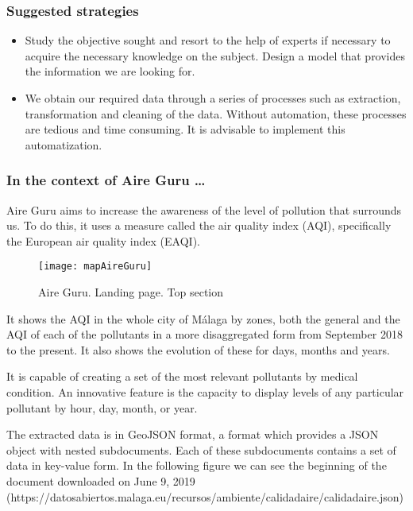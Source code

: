 \subsubsection*{Suggested strategies} 

\begin{itemize}
    \item Study the objective sought and resort to the help of experts if necessary to acquire the necessary knowledge
    on the subject. Design a model that provides the information we are looking for.

    \item We obtain our required data through a series of processes such as extraction, transformation and
    cleaning of the data. Without automation, these processes are tedious and time consuming. It is advisable to 
    implement this automatization.
\end{itemize}

\subsubsection*{In the context of Aire Guru \ldots} 

Aire Guru aims to increase the awareness of the level of pollution that surrounds us. To do this, it uses a measure called
the air quality index (AQI), specifically the European air quality index (EAQI).

\begin{figure}[ht]
    \centering
    \texttt{[image: mapAireGuru]}
    \caption{Aire Guru. Landing page. Top section}
\end{figure}

It shows the AQI in the whole city of Málaga by zones, both the general and the AQI of each of the 
pollutants in a more disaggregated form from September 2018 to the present. It also shows the evolution
of these for days, months and years.

It is capable of creating a set of the most relevant pollutants by medical condition. An innovative feature is the capacity 
to display levels of any particular pollutant by hour, day, month, or year. 

The extracted data is in GeoJSON format, a format which provides a JSON object with nested subdocuments. Each of these
subdocuments contains a set of data in key-value form.
In the following figure we can see the beginning of the document downloaded on June 9, 2019
(https://datosabiertos.malaga.eu/recursos/ambiente/calidadaire/calidadaire.json) \\

